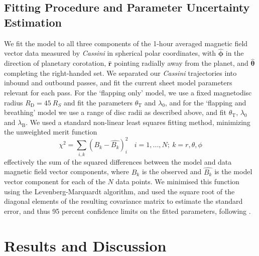\subsection{Fitting Procedure and Parameter Uncertainty Estimation}
We fit the model to all three components of the 1-hour averaged magnetic field vector data measured by \textit{Cassini} in spherical polar coordinates, with $\boldsymbol{\hat{\phi}}$ in the direction of planetary corotation, $\boldsymbol{\hat{r}}$ pointing radially away from the planet, and $\boldsymbol{\hat{\theta}}$ completing the right-handed set. We separated our \textit{Cassini} trajectories into inbound and outbound passes, and fit the current sheet model parameters relevant for each pass. For the `flapping only' model, we use a fixed magnetodisc radius $R_\mathrm{D} = \SI{45}{R_S}$ and fit the parameters $\theta_\mathrm{T}$ and $\lambda_0$, and for the `flapping and breathing' model we use a range of disc radii as described above, and fit $\theta_\mathrm{T}$, $\lambda_0$ and $\lambda_\mathrm{B}$. We used a standard non-linear least squares fitting method, minimizing the unweighted merit function
\begin{equation}
\chi^2 = \sum\limits_{i,k}(B_{k}-\hat{B_{k}})_i^2~~~~i = 1,...,N;~k = r,\theta,\phi
\end{equation}
effectively the sum of the squared differences between the model and data magnetic field vector components, where $B_k$ is the observed and $\hat{B_k}$ is the model vector component for each of the $N$ data points. We minimised this function using the Levenberg-Marquardt algorithm, and used the square root of the diagonal elements of the resulting covariance matrix to estimate the standard error, and thus 95 percent confidence limits on the fitted parameters, following \citet{press2007}.

\section{Results and Discussion}\label{equinox:sec:results}
